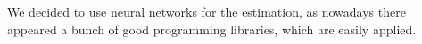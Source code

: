 \documentclass[conference,a4]{IEEEtran}
\begin{document}
We decided to use neural networks for the estimation, as nowadays there appeared a bunch of good programming libraries, which are easily applied.


\end{document}
